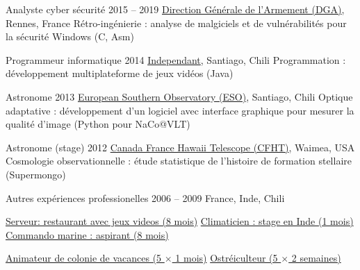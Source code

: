 \begin{joblist}[12.8][8.4][4]

\setlength{\parskip}{0.3cm}
\vspace{-0.4cm}

\item[Analyste cyber sécurité]{2015 -- 2019}
	{
  \href{http://www.defense.gouv.fr/dga/}{Direction Générale de l'Armement (DGA)}, Rennes, France
  }
  {Rétro-ingénierie : analyse de malgiciels et de vulnérabilités pour la sécurité Windows (C, Asm)}

\item[Programmeur informatique]{2014}
	{
	\href{https://tinmarino.github.io/Page/}{Independant}, Santiago, Chili
  }
  {Programmation : développement multiplateforme de jeux vidéos (Java)}



\item[Astronome]{2013}
	{
	\href{http://www.eso.org/public/}{European Southern Observatory (ESO)}, Santiago, Chili
	}
  {Optique adaptative : développement d'un logiciel avec interface graphique pour mesurer la qualité d'image (Python pour NaCo@VLT)}

\item[Astronome (stage)]{2012}
	{
\href{https://www.cfht.hawaii.edu/}{Canada France Hawaii Telescope (CFHT)}, Waimea, USA
  }
  {Cosmologie observationnelle : étude statistique de l'histoire de formation stellaire (Supermongo)}

\item[Autres expériences professionelles]{2006 -- 2009}
	{
	France, Inde, Chili
	}
	{
    \renewcommand\labelitemi{{}}
		\vspace{-0.8cm}
    \setlength{\parskip}{0cm}
		\begin{itemize}
		\setlength\itemsep{0cm}
    \cvitem \href{http://www.insertcoin.cl/}{ Serveur: restaurant avec jeux videos (8 mois)}
    \cvitem \href{http://www.dupont.co.in/}{ Climaticien : stage en Inde (1 mois)}
    \cvitem \href{http://www.defense.gouv.fr/marine/organisation/forces/fusiliers-marins-et-commandos/force-maritime-des-fusiliers-marins-et-commandos}{ Commando marine : aspirant (8 mois)}
	
    \cvitem \href{http://www.vacances-pour-tous.org/}{ Animateur de colonie de vacances (5 $\times$ 1 mois)}
    \cvitem \href{http://huitresdesaintvaast.fr/}{ Ostréiculteur (5 $\times$ 2 semaines)}
		\end{itemize}
  }
\end{joblist}



